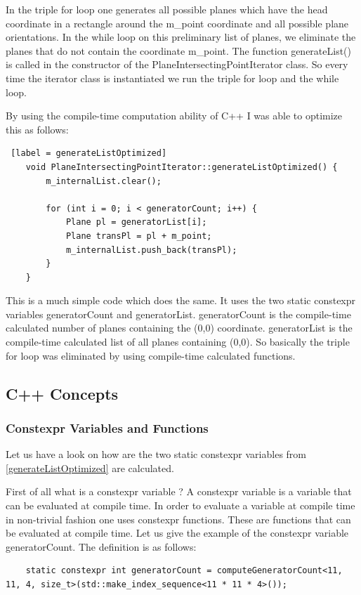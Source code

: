 In the triple for loop one generates all possible planes which have the head coordinate in a rectangle around the m\_point coordinate and all possible plane orientations. In the while loop on this preliminary list of planes, we eliminate the planes that do not contain the coordinate m\_point. The function generateList() is called in the constructor of the PlaneIntersectingPointIterator class. So every time the iterator class is instantiated we run the triple for loop and the while loop. 

By using the compile-time computation ability of C++ I was able to optimize this as follows:

\begin{lstlisting} [label = generateListOptimized]
	void PlaneIntersectingPointIterator::generateListOptimized() {
		m_internalList.clear();
		
		for (int i = 0; i < generatorCount; i++) {
			Plane pl = generatorList[i];
			Plane transPl = pl + m_point;
			m_internalList.push_back(transPl);
		}
	}
\end{lstlisting}

This is a much simple code which does the same. It uses the two static constexpr variables generatorCount and generatorList. generatorCount is the compile-time calculated number of planes containing the (0,0) coordinate. generatorList is the compile-time calculated list of all planes containing (0,0). So basically the triple for loop was eliminated by using compile-time calculated functions.


\subsection {C++ Concepts}
\subsubsection {Constexpr Variables and Functions}

Let us have a look on how are the two static constexpr variables from \ref{generateListOptimized} are calculated.

First of all what is a constexpr variable ? A constexpr variable is a variable that can be evaluated at compile time. In order to evaluate a variable at compile time in non-trivial fashion one uses constexpr functions. These are functions that can be evaluated at compile time. Let us give the example of the constexpr variable generatorCount. The definition is as follows:

\begin{lstlisting}
	static constexpr int generatorCount = computeGeneratorCount<11, 11, 4, size_t>(std::make_index_sequence<11 * 11 * 4>());
\end{lstlisting}

